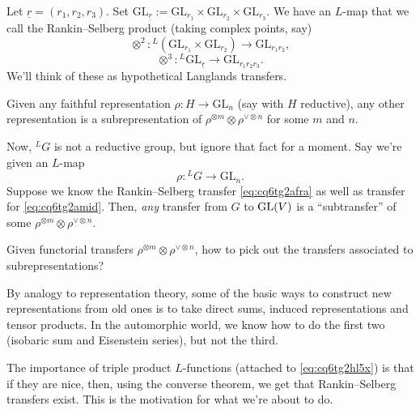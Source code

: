 \documentclass[reqno]{amsart} 
\begin{document}
Let $\underline{r} =(r_1, r_2, r_3)$.  Set $\mathrm{GL}_{\underline{r}} :=\mathrm{GL}_{r_1} \times\mathrm{GL}_{r_2} \times\mathrm{GL}_{r_3}$.  We have an $L$-map that we call the Rankin--Selberg product (taking complex points, say)
\begin{equation}\label{eq:cq6tg2afra}
  \otimes^2 : {}^L(\mathrm{GL}_{r_1} \times\mathrm{GL}_{r_2}) \rightarrow\mathrm{GL}_{r_1 r_2},
\end{equation}
\begin{equation}\label{eq:cq6tg2hl5x}
  \otimes^3 : {}^L\mathrm{GL}_{\underline{r}} \rightarrow\mathrm{GL}_{r_1 r_2 r_3}.
\end{equation}
We'll think of these as hypothetical Langlands transfers.
\begin{theorem}[Chevalley]\label{theorem:cq6tho7t2z}
  Given any faithful representation $\rho : H \rightarrow \mathrm{GL}_n$ (say with $H$ reductive), any other representation is a subrepresentation of $\rho^{\otimes m} \otimes \rho^{\vee \otimes n}$ for some $m$ and $n$.
\end{theorem}
Now, ${}^L G$ is not a reductive group, but ignore that fact for a moment.  Say we're given an $L$-map
\begin{equation}\label{eq:cq6tg2amid}
  \rho :{}^L G \rightarrow \mathrm{GL}_n.
\end{equation}
Suppose we know the Rankin--Selberg transfer \eqref{eq:cq6tg2afra} as well as transfer for \eqref{eq:cq6tg2amid}.  Then, \emph{any} transfer from $G$ to $\operatorname{GL}(V)$ is a ``subtransfer'' of some $\rho^{\otimes m} \otimes \rho^{\vee \otimes n}$.

\begin{question}\label{question:cq6tho7sd5}
  Given functorial transfers $\rho^{\otimes m} \otimes \rho^{\vee \otimes n}$, how to pick out the transfers associated to subrepresentations?
\end{question}

By analogy to representation theory, some of the basic ways to construct new representations from old ones is to take direct sums, induced representations and tensor products.  In the automorphic world, we know how to do the first two (isobaric sum and Eisenstein series), but not the third.

The importance of triple product $L$-functions (attached to \eqref{eq:cq6tg2hl5x}) is that if they are nice, then, using the converse theorem, we get that Rankin--Selberg transfers exist.  This is the motivation for what we're about to do.
\end{document}
